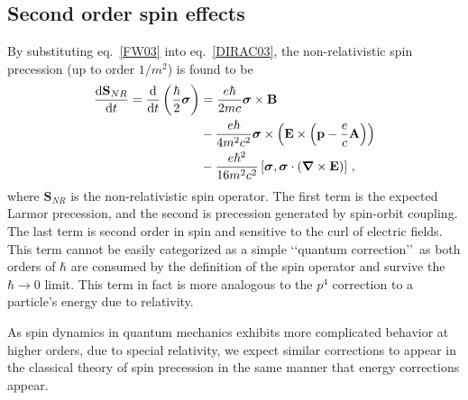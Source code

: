 \subsection{Second order spin effects}
By substituting eq.~\eqref{FW03} into eq.~\eqref{DIRAC03}, the non-relativistic spin precession (up to order $1/m^{2}$) is found to be
\begin{alignat}{1}
  \notag\frac{\mathrm{d}\mathbf{S}_{NR}}{\mathrm{d}t}=\frac{\mathrm{d}}{\mathrm{d}t}\left(\frac{\hbar}{2}\boldsymbol{\sigma}\right)&=\frac{e\hbar}{2mc}\boldsymbol{\sigma}\times\mathbf{B}\\
  \notag&-\frac{e\hbar}{4m^{2}c^{2}}\boldsymbol{\sigma}\times\left(\mathbf{E}\times\left(\mathbf{p}-\frac{e}{c}\mathbf{A}\right)\right)\\
  \label{SPIN01}&-\frac{e\hbar^{2}}{16m^{2}c^{2}}\left[\boldsymbol{\sigma},\boldsymbol{\sigma}\cdot\left(\boldsymbol{\nabla}\times\mathbf{E}\right)\right]\,,
\end{alignat}
where $\mathbf{S}_{NR}$ is the non-relativistic spin operator. The first term is the expected Larmor precession, and the second is precession generated by spin-orbit coupling. The last term is second order in spin and sensitive to the curl of electric fields. This term cannot be easily categorized as a simple \lq\lq quantum correction\rq\rq\, as both orders of $\hbar$ are consumed by the definition of the spin operator and survive the $\hbar\rightarrow 0$ limit. This term in fact is more analogous to the $p^{4}$ correction to a particle's energy due to relativity.

As spin dynamics in quantum mechanics exhibits more complicated behavior at higher orders, due to special relativity, we expect similar corrections to appear in the classical theory of spin precession in the same manner that energy corrections appear.

